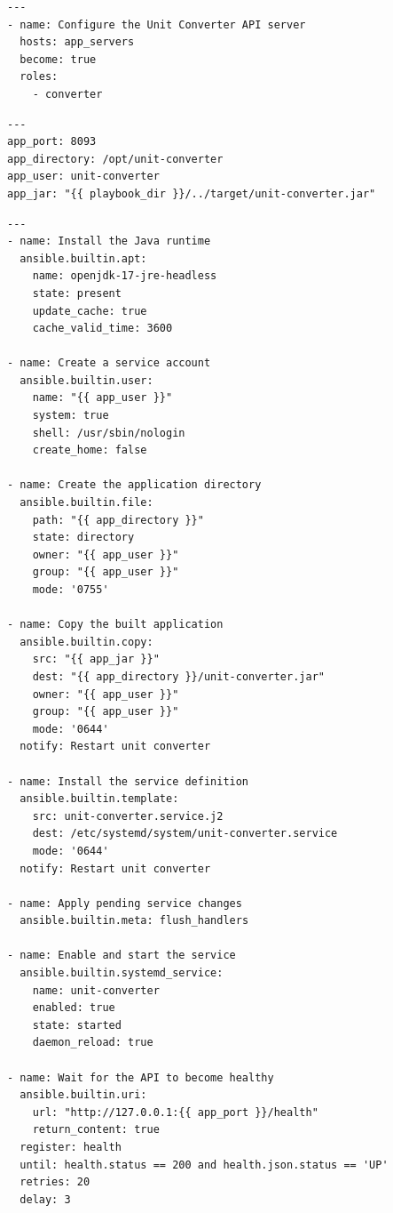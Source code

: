\documentclass[12pt,a4paper]{article}
\begin{document}
\begin{lstlisting}
---
- name: Configure the Unit Converter API server
  hosts: app_servers
  become: true
  roles:
    - converter
\end{lstlisting}

\par\medskip{}\noindent\textbf{}\par\smallskip

\begin{lstlisting}
---
app_port: 8093
app_directory: /opt/unit-converter
app_user: unit-converter
app_jar: "{{ playbook_dir }}/../target/unit-converter.jar"
\end{lstlisting}

\par\medskip{}\noindent\textbf{}\par\smallskip

\begin{lstlisting}
---
- name: Install the Java runtime
  ansible.builtin.apt:
    name: openjdk-17-jre-headless
    state: present
    update_cache: true
    cache_valid_time: 3600

- name: Create a service account
  ansible.builtin.user:
    name: "{{ app_user }}"
    system: true
    shell: /usr/sbin/nologin
    create_home: false

- name: Create the application directory
  ansible.builtin.file:
    path: "{{ app_directory }}"
    state: directory
    owner: "{{ app_user }}"
    group: "{{ app_user }}"
    mode: '0755'

- name: Copy the built application
  ansible.builtin.copy:
    src: "{{ app_jar }}"
    dest: "{{ app_directory }}/unit-converter.jar"
    owner: "{{ app_user }}"
    group: "{{ app_user }}"
    mode: '0644'
  notify: Restart unit converter

- name: Install the service definition
  ansible.builtin.template:
    src: unit-converter.service.j2
    dest: /etc/systemd/system/unit-converter.service
    mode: '0644'
  notify: Restart unit converter

- name: Apply pending service changes
  ansible.builtin.meta: flush_handlers

- name: Enable and start the service
  ansible.builtin.systemd_service:
    name: unit-converter
    enabled: true
    state: started
    daemon_reload: true

- name: Wait for the API to become healthy
  ansible.builtin.uri:
    url: "http://127.0.0.1:{{ app_port }}/health"
    return_content: true
  register: health
  until: health.status == 200 and health.json.status == 'UP'
  retries: 20
  delay: 3
\end{lstlisting}
\end{document}
